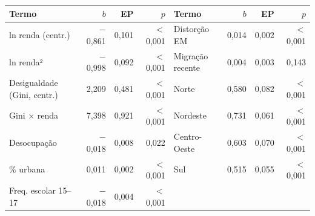 \begin{tabular*}{\textwidth}{@{\extracolsep{\fill}}lrrrlrrr@{}}
\toprule
\textbf{Termo} & \textbf{$b$} & \textbf{EP} & \textbf{$p$} & \textbf{Termo} & \textbf{$b$} & \textbf{EP} & \textbf{$p$}\\
\midrule
ln renda (centr.) & $-$0,861 & 0,101 & $<$0,001 & Distorção EM & 0,014 & 0,002 & $<$0,001\\
ln renda² & $-$0,998 & 0,092 & $<$0,001 & Migração recente & 0,004 & 0,003 & 0,143\\
Desigualdade (Gini, centr.) & 2,209 & 0,481 & $<$0,001 & Norte & 0,580 & 0,082 & $<$0,001\\
Gini $\times$ renda & 7,398 & 0,921 & $<$0,001 & Nordeste & 0,731 & 0,061 & $<$0,001\\
Desocupação & $-$0,018 & 0,008 & 0,022 & Centro-Oeste & 0,603 & 0,070 & $<$0,001\\
\% urbana & 0,011 & 0,002 & $<$0,001 & Sul & 0,515 & 0,055 & $<$0,001\\
Freq. escolar 15--17 & $-$0,018 & 0,004 & $<$0,001 &  & & & \\
\bottomrule
\end{tabular*}
